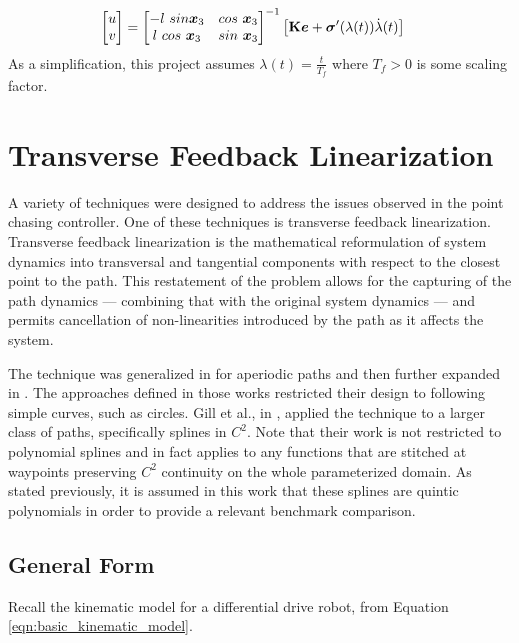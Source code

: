 \documentclass[oneside, 11pt]{book}
\begin{document}
\begin{align*}
    \begin{bmatrix}
        u \\ v
    \end{bmatrix}   &=  \begin{bmatrix}
                            -l~sin\bm{x}_3 & cos~\bm{x}_3 \\
                            l~cos~\bm{x}_3 & sin~\bm{x}_3 \\
                        \end{bmatrix}^{-1}
                        \left[
                            \mathbf{K}\bm{e} + \bm{\sigma}'(\lambda(t))\dot{\lambda}(t)
                        \right]
\end{align*}
As a simplification, this project assumes $\lambda(t)=\frac{t}{T_f}$ where $T_f > 0$ is some scaling factor.

\section{Transverse Feedback Linearization}
A variety of techniques were designed to address the issues observed in the point chasing controller. One of these techniques is transverse feedback linearization. Transverse feedback linearization is the mathematical reformulation of system dynamics into transversal and tangential components with respect to the closest point to the path. This restatement of the problem allows for the capturing of the path dynamics --- combining that with the original system dynamics --- and permits cancellation of non-linearities introduced by the path as it affects the system.

The technique was generalized in \cite{Nielsen06} for aperiodic paths and then further expanded in \cite{Hladio13}. The approaches defined in those works restricted their design to following simple curves, such as circles. Gill et al., in \cite{Gill15}, applied the technique to a larger class of paths, specifically splines in $C^2$. Note that their work is not restricted to polynomial splines and in fact applies to any functions that are stitched at waypoints preserving $C^2$ continuity on the whole parameterized domain. As stated previously, it is assumed in this work that these splines are quintic polynomials in order to provide a relevant benchmark comparison.

\subsection{General Form}\label{sec:general_tfl}
Recall the kinematic model for a differential drive robot, from Equation \ref{eqn:basic_kinematic_model}.
\end{document}
